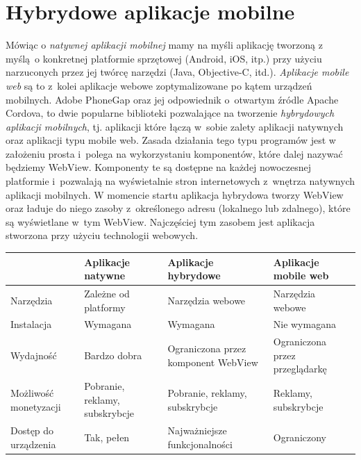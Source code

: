 \documentclass[brudnopis]{xmgr}
\begin{document}
\section{Hybrydowe aplikacje mobilne}
Mówiąc o \textit{natywnej aplikacji mobilnej} mamy na myśli aplikację tworzoną z myślą~o konkretnej platformie sprzętowej (Android, iOS, itp.) przy użyciu narzuconych przez jej twórcę narzędzi (Java, Objective-C, itd.).  \textit{Aplikacje mobile web} są to z~kolei aplikacje webowe zoptymalizowane po kątem urządzeń mobilnych.
Adobe PhoneGap oraz jej odpowiednik o~otwartym źródle Apache Cordova, to
dwie popularne biblioteki pozwalające na tworzenie \textit{hybrydowych aplikacji
mobilnych}, tj. aplikacji które łączą w~sobie zalety aplikacji natywnych oraz aplikacji
typu mobile web. Zasada działania tego typu programów jest w założeniu prosta i~polega na wykorzystaniu komponentów, które dalej nazywać będziemy WebView.
Komponenty te są dostępne na każdej nowoczesnej platformie i~pozwalają na
wyświetalnie stron internetowych z~wnętrza natywnych aplikacji mobilnych. 
W momencie startu aplikacja hybrydowa tworzy WebView oraz ładuje do niego zasoby z~określonego adresu (lokalnego lub zdalnego), które są wyświetlane w~tym WebView. Najczęściej tym zasobem jest aplikacja stworzona przy użyciu technologii webowych.     

\begin{center}
    \begin{tabularx}{\textwidth}{ | X | X | X | X |}
    \hline
   			& Aplikacje natywne        & Aplikacje hybrydowe 	& Aplikacje mobile web 			\\ \hline
    Narzędzia	& Zależne od platformy	&   Narzędzia webowe	& 	Narzędzia webowe			\\ \hline
    Instalacja	&        Wymagana               &	 Wymagana         	& 		Nie wymagana		\\ \hline
    Wydajność	& 	Bardzo dobra		&Ograniczona przez komponent WebView&Ograniczona przez przeglądarkę\\ \hline
    Możliwość monetyzacji
    			&  Pobranie, reklamy, subskrybcje  & Pobranie, reklamy, subskrybcje & Reklamy, subskrybcje \\ \hline
    Dostęp do urządzenia
    			& 	Tak, pełen  	         &Najważniejsze funkcjonalności& Ograniczony        \\ \hline
    \end{tabularx}
\end{center}
\end{document}
